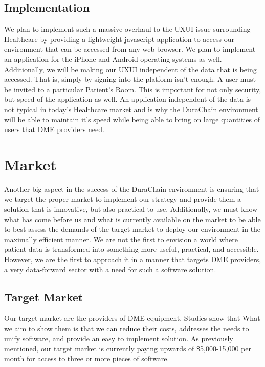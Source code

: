 \documentclass[letterpaper]{article}
\begin{document}
\subsection{Implementation}
We plan to implement such a massive overhaul to the UXUI issue surrounding Healthcare by providing a lightweight javascript application to access our environment that can be accessed from any web browser. We plan to implement an application for the iPhone and Android operating systems as well. Additionally, we will be making our UXUI independent of the data that is being accessed. That is, simply by signing into the platform isn’t enough. A user must be invited to a particular Patient’s Room. This is important for not only security, but speed of the application as well. An application independent of the data is not typical in today’s Healthcare market and is why the DuraChain environment will be able to maintain it’s speed while being able to bring on large quantities of users that DME providers need.
%
\section{Market}
Another big aspect in the success of the DuraChain environment is ensuring that we target the proper market to implement our strategy and provide them a solution that is innovative, but also practical to use. Additionally, we must know what has come before us and what is currently available on the market to be able to best assess the demands of the target market to deploy our environment in the maximally efficient manner. We are not the first to envision a world where patient data is transformed into something more useful, practical, and accessible. However, we are the first to approach it in a manner that targets DME providers, a very data-forward sector with a need for such a software solution.
%
\subsection{Target Market}
Our target market are the providers of DME equipment. Studies show that What we aim to show them is that we can reduce their costs, addresses the needs to unify software, and provide an easy to implement solution. As previously mentioned, our target market is currently paying upwards of \$5,000-15,000 per month for access to three or more pieces of software.
%
\end{document}
